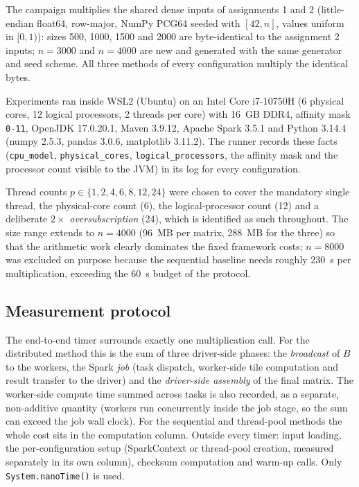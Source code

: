 \documentclass[11pt,a4paper]{article}
\begin{document}
The campaign multiplies the shared dense inputs of assignments 1 and 2
(little-endian float64, row-major, NumPy PCG64 seeded with $[42, n]$,
values uniform in $[0,1)$): sizes 500, 1000, 1500 and 2000 are
byte-identical to the assignment 2 inputs; $n = 3000$ and $n = 4000$ are
new and generated with the same generator and seed scheme. All three
methods of every configuration multiply the identical bytes.

Experiments ran inside WSL2 (Ubuntu) on an Intel Core i7-10750H (6 physical
cores, 12 logical processors, 2 threads per core) with 16~GB DDR4, affinity
mask \texttt{0-11}, OpenJDK 17.0.20.1, Maven 3.9.12, Apache Spark 3.5.1
and Python 3.14.4 (numpy 2.5.3, pandas 3.0.6, matplotlib 3.11.2). The
runner records these facts (\texttt{cpu\_model}, \texttt{physical\_cores},
\texttt{logical\_processors}, the affinity mask and the processor count
visible to the JVM) in its log for every configuration.

Thread counts $p \in \{1, 2, 4, 6, 8, 12, 24\}$ were chosen to cover the
mandatory single thread, the physical-core count (6), the logical-processor
count (12) and a deliberate $2\times$ \emph{oversubscription} (24), which is
identified as such throughout. The size range extends to $n = 4000$ (96~MB
per matrix, 288~MB for the three) so that the arithmetic work clearly
dominates the fixed framework costs; $n = 8000$ was excluded on purpose
because the sequential baseline needs roughly 230~s per multiplication,
exceeding the 60~s budget of the protocol.

\subsection{Measurement protocol}

The end-to-end timer surrounds exactly one multiplication call. For the
distributed method this is the sum of three driver-side phases: the
\emph{broadcast} of $B$ to the workers, the Spark \emph{job} (task
dispatch, worker-side tile computation and result transfer to the driver)
and the \emph{driver-side assembly} of the final matrix. The worker-side
compute time summed across tasks is also recorded, as a separate,
non-additive quantity (workers run concurrently inside the job stage, so
the sum can exceed the job wall clock). For the sequential and thread-pool
methods the whole cost sits in the computation column. Outside every timer:
input loading, the per-configuration setup (SparkContext or thread-pool
creation, measured separately in its own column), checksum computation and
warm-up calls. Only \texttt{System.nanoTime()} is used.
\end{document}
